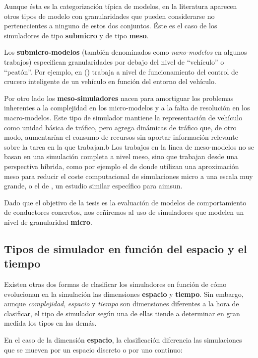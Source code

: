 Aunque ésta es la categorización típica de modelos, en la literatura aparecen otros tipos de modelo con granularidades que pueden considerarse no pertenecientes a ninguno de estos dos conjuntos. Éste es el caso de los simuladores de tipo \textbf{submicro} y de tipo \textbf{meso}.

Los \textbf{submicro-modelos} (también denominados como \textit{nano-modelos} en algunos trabajos) especifican granularidades por debajo del nivel de \enquote{vehículo} o \enquote{peatón}. Por ejemplo, en (\cite{Minderhoud1999}) trabaja a nivel de funcionamiento del control de crucero inteligente de un vehículo en función del entorno del vehículo.

Por otro lado los \textbf{meso-simuladores} nacen para amortiguar los problemas inherentes a la complejidad en los micro-modelos y a la falta de resolución en los macro-modelos. Este tipo de simulador mantiene la representación de vehículo como unidad básica de tráfico, pero agrega dinámicas de tráfico que, de otro modo, aumentarían el consumo de recursos sin aportar información relevante sobre la tarea en la que trabajan.b Los trabajos en la línea de meso-modelos no se basan en una simulación completa a nivel meso, sino que trabajan desde una perspectiva híbrida, como por ejemplo el de \cite{munoz2001integrated} donde utilizan una aproximación meso para reducir el coste computacional de simulaciones micro a una escala muy grande, o el de \cite{casas2011need}, un estudio similar específico para \gls{aimsun}.

Dado que el objetivo de la tesis es la evaluación de modelos de comportamiento de conductores concretos, nos ceñiremos al uso de simuladores que modelen un nivel de granularidad \textbf{micro}.

\subsection{Tipos de simulador en función del espacio y el tiempo}

Existen otras dos formas de clasificar los simuladores en función de cómo evolucionan en la simulación las dimensiones \textbf{espacio} y  \textbf{tiempo}. Sin embargo, aunque \textit{complejidad}, \textit{espacio} y \textit{tiempo} son dimensiones diferentes a la hora de clasificar, el tipo de simulador según una de ellas tiende a determinar en gran medida los tipos en las demás.

En el caso de la dimensión \textbf{espacio}, la clasificación diferencia las simulaciones que se mueven por un espacio discreto o por uno continuo:

